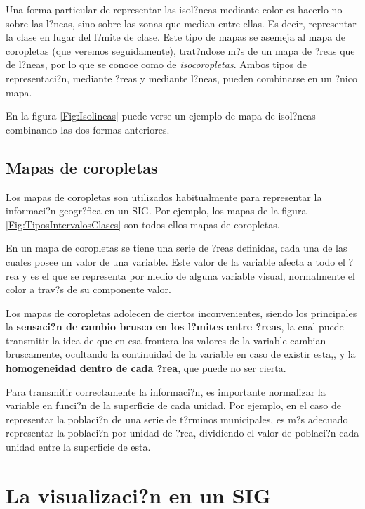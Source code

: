Una forma particular de representar las isol?neas mediante color es hacerlo no sobre las l?neas, sino sobre las zonas que median entre ellas. Es decir, representar la clase en lugar del l?mite de clase. Este tipo de mapas se asemeja al mapa de coropletas (que veremos seguidamente), trat?ndose m?s de un mapa de ?reas que de l?neas, por lo que se conoce como de \emph{isocoropletas}. Ambos tipos de representaci?n, mediante ?reas y mediante l?neas, pueden combinarse en un ?nico mapa.

En la figura \ref{Fig:Isolineas} puede verse un ejemplo de mapa de isol?neas combinando las dos formas anteriores.


\subsection{Mapas de coropletas}

Los mapas de coropletas son utilizados habitualmente para representar la informaci?n geogr?fica en un SIG. Por ejemplo, los mapas de la figura \ref{Fig:TiposIntervalosClases} son todos ellos mapas de coropletas.

En un mapa de coropletas se tiene una serie de ?reas definidas, cada una de las cuales posee un valor de una variable. Este valor de la variable afecta a todo el ?rea y es el que se representa por medio de alguna variable visual, normalmente el color a trav?s de su componente valor.

Los mapas de coropletas adolecen de ciertos inconvenientes, siendo los principales la \textbf{sensaci?n de cambio brusco en los l?mites entre ?reas}, la cual puede transmitir la idea de que en esa frontera los valores de la variable cambian bruscamente, ocultando la continuidad de la variable en caso de existir esta,, y la \textbf{homogeneidad dentro de cada ?rea}, que puede no ser cierta.

Para transmitir correctamente la informaci?n, es importante normalizar la variable en funci?n de la superficie de cada unidad. Por ejemplo, en el caso de representar la poblaci?n de una serie de t?rminos municipales, es m?s adecuado representar la poblaci?n por unidad de ?rea, dividiendo el valor de poblaci?n cada unidad entre la superficie de esta.


\section{La visualizaci?n en un SIG}


